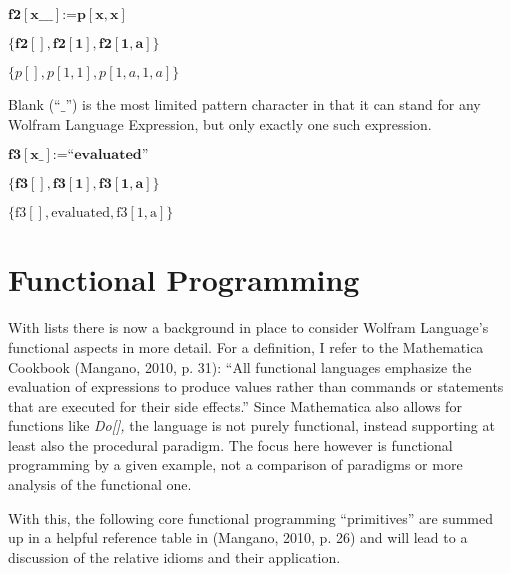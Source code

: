 \documentclass{article}
\begin{document}
\begin{doublespace}
\noindent\(\pmb{\text{f2}[\text{x$\_\_\_$}]\text{:=}p[x,x]}\)
\end{doublespace}

\begin{doublespace}
\noindent\(\pmb{\{\text{f2}[],\text{f2}[1],\text{f2}[1,a]\}}\)
\end{doublespace}

\begin{doublespace}
\noindent\(\{p[],p[1,1],p[1,a,1,a]\}\)
\end{doublespace}

Blank ({``}$\_${''}) is the most limited pattern character in that it can stand for any Wolfram Language Expression, but only exactly one such expression.

\begin{doublespace}
\noindent\(\pmb{\text{f3}[\text{x$\_$}] \text{:=} \text{{``}evaluated{''}}}\)
\end{doublespace}

\begin{doublespace}
\noindent\(\pmb{\{\text{f3}[], \text{f3}[1], \text{f3}[1, \text{a}]\}}\)
\end{doublespace}

\begin{doublespace}
\noindent\(\{\text{f3}[],\text{evaluated},\text{f3}[1,\text{a}]\}\)
\end{doublespace}

\section*{Functional Programming}

With lists there is now a background in place to consider Wolfram Language{'}s functional aspects in more detail. For a definition, I refer to the
Mathematica Cookbook (Mangano, 2010, p. 31): {``}All functional languages emphasize the evaluation of expressions to produce values rather than commands
or statements that are executed for their side effects.{''} Since Mathematica also allows for functions like \textit{ Do[],} the language is not
purely functional, instead supporting at least also the procedural paradigm. The focus here however is functional programming by a given example,
not a comparison of paradigms or more analysis of the functional one.

With this, the following core functional programming {``}primitives{''} are summed up in a helpful reference table in (Mangano, 2010, p. 26) and
will lead to a discussion of the relative idioms and their application.
\end{document}
